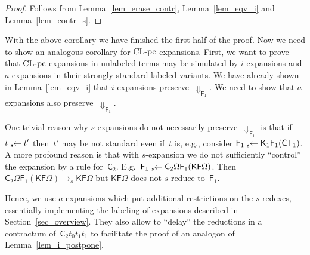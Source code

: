 \documentclass[a4paper,UKenglish]{lipics-v2016}
\newcommand{\Cs}{\mathsf{C}}
\newcommand{\Fs}{\mathsf{F}}
\newcommand{\Ts}{\mathsf{T}}
\newcommand{\Ks}{\mathsf{K}}
\newcommand{\from}{\ensuremath{\leftarrow}}
\newcommand{\Da}{\ensuremath{\Downarrow}}
\newcommand{\leftidx}[3]{{\;\vphantom{#2}}#1\!\!#2#3}
\newcommand{\CLCz}{{\mbox{$\text{\rm CL-pc}$}}}
\begin{document}
\begin{proof}
  Follows from Lemma~\ref{lem_erase_contr}, Lemma~\ref{lem_eqv_i} and
  Lemma~\ref{lem_contr_s}.
\end{proof}

With the above corollary we have finished the first half of the
proof. Now we need to show an analogous corollary for
$\CLCz$-expansions. First, we want to prove that $\CLCz$-expansions in
unlabeled terms may be simulated by $i$-expansions and $a$-expansions
in their strongly standard labeled variants. We have already shown in
Lemma~\ref{lem_eqv_i} that $i$-expansions preserve~$\Da_{\Fs_1}$. We
need to show that $a$-expansions also preserve~$\Da_{\Fs_1}$.

One trivial reason why $s$-expansions do not necessarily
preserve~$\Da_{\Fs_1}$ is that if $t \leftidx{{}_s}{\from} t'$
then~$t'$ may be not standard even if~$t$ is, e.g., consider
$\Fs_1 \leftidx{{}_s}{\from} \Ks_1 \Fs_1 (\Cs \Ts_1)$. A more profound
reason is that with $s$-expansion we do not sufficiently ``control''
the expansion by a rule for~$\Cs_2$.
E.g.~$\Fs_1 \leftidx{{}_s}{\from} \Cs_2 \Omega \Fs_1 (\Ks \Fs
\Omega)$. Then
$\Cs_2 \Omega \Fs_1 (\Ks \Fs \Omega) \to_s \Ks \Fs \Omega$ but
$\Ks \Fs \Omega$ does not $s$-reduce to~$\Fs_1$.

Hence, we use $a$-expansions which put additional restrictions on the
$s$-redexes, essentially implementing the labeling of expansions
described in Section~\ref{sec_overview}. They also allow to ``delay''
the reductions in a contractum of~$\Cs_2 t_0 t_1 t_1$ to facilitate
the proof of an analogon of Lemma~\ref{lem_i_postpone}.
\end{document}
